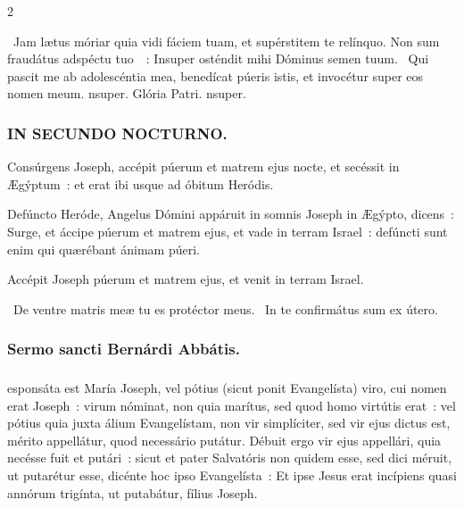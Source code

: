 \documentclass[9pt,twoside]{extarticle}
\begin{document}
\begin{multicols}{2}
{{\begin{tightlist}{}
\item {}~Jam lætus móriar quia vidi fáciem tuam, et supérstitem te relínquo. Non sum fraudátus adspéctu tuo~~: \textred{*} Insuper osténdit mihi Dóminus semen tuum. ~Qui pascit me ab adolescéntia mea, benedícat púeris istis, et invocétur super eos nomen meum. nsuper. Glória Patri. nsuper.
\end{tightlist}

\subsubsection*{\center \textsc{IN SECUNDO NOCTURNO.}}
\begin{tightlist}{}
\item {} Consúrgens Joseph, accépit púerum et matrem ejus nocte, et secéssit in Ægýptum~: et erat ibi usque ad óbitum Heródis.
\item {} Defúncto Heróde, Angelus Dómini appáruit in somnis Joseph in Ægýpto, dicens~: Surge, et áccipe púerum et matrem ejus, et vade in terram Israel~: defúncti sunt enim qui quærébant ánimam púeri.
\item {} Accépit Joseph púerum et matrem ejus, et venit in terram Israel.
\item {}~De ventre matris meæ tu es protéctor meus. ~In te confirmátus sum ex útero.
\end{tightlist}

\subsubsection*{\center Sermo sancti Bernárdi Abbátis.}
\subsubsection*{\center {}}
esponsáta est María Joseph, vel pótius (sicut ponit Evangelísta) viro, cui nomen erat Joseph~: virum nóminat, non quia marítus, sed quod homo virtútis erat~: vel pótius quia juxta álium Evangelístam, non vir simplíciter, sed vir ejus dictus est, mérito appellátur, quod necessário putátur. Débuit ergo vir ejus appellári, quia necésse fuit et putári~: sicut et pater Salvatóris non quidem esse, sed dici méruit, ut putarétur esse, dicénte hoc ipso Evangelísta~: Et ipse Jesus erat incípiens quasi annórum trigínta, ut putabátur, fílius Joseph.

}}
\end{multicols}
\end{document}
